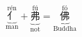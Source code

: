 \[ \underbrace{\overset{\text{rén}}{\text{亻}}}_{\text{man}} + \underbrace{\overset{\text{fú}}{\text{弗}}}_{\text{not}} = \underbrace{\overset{\text{fó}}{\text{佛}}}_{\text{Buddha}} \]
